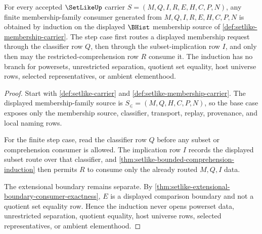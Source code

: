 \begin{theorem}
\label{thm:setlike-membership-family-bhist-induction}
For every accepted $\SetLikeUp$ carrier $S=(M,Q,I,R,E,H,C,P,N)$, any finite membership-family consumer generated from $M,Q,I,R,E,H,C,P,N$ is obtained by induction on the displayed $\BHist$ membership source of \autoref{def:setlike-membership-carrier}. The step case first routes a displayed membership request through the classifier row $Q$, then through the subset-implication row $I$, and only then may the restricted-comprehension row $R$ consume it. The induction has no branch for powersets, unrestricted separation, quotient set equality, host universe rows, selected representatives, or ambient elementhood.
\end{theorem}
\begin{proof}
Start with \autoref{def:setlike-carrier} and \autoref{def:setlike-membership-carrier}. The displayed membership-family source is $S_{\in}=(M,Q,H,C,P,N)$, so the base case exposes only the membership source, classifier, transport, replay, provenance, and local naming rows.

For the finite step case, read the classifier row $Q$ before any subset or comprehension consumer is allowed. The implication row $I$ records the displayed subset route over that classifier, and \autoref{thm:setlike-bounded-comprehension-induction} then permits $R$ to consume only the already routed $M,Q,I$ data.

The extensional boundary remains separate. By \autoref{thm:setlike-extensional-boundary-consumer-exactness}, $E$ is a displayed comparison boundary and not a quotient set equality row. Hence the induction never opens powerset data, unrestricted separation, quotient equality, host universe rows, selected representatives, or ambient elementhood.
\end{proof}

